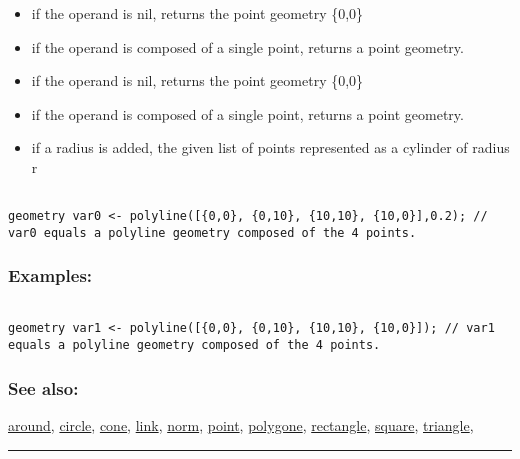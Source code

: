 \documentclass[]{book}
\providecommand{\tightlist}{%
  \setlength{\itemsep}{0pt}\setlength{\parskip}{0pt}}
\theoremstyle{definition}
\theoremstyle{definition}
\theoremstyle{definition}
\theoremstyle{remark}
\begin{document}
\begin{itemize}
\tightlist
\item
  if the operand is nil, returns the point geometry \{0,0\}\\
\item
  if the operand is composed of a single point, returns a point
  geometry.\\
\item
  if the operand is nil, returns the point geometry \{0,0\}\\
\item
  if the operand is composed of a single point, returns a point
  geometry.\\
\item
  if a radius is added, the given list of points represented as a
  cylinder of radius r
\end{itemize}

\begin{verbatim}
 
geometry var0 <- polyline([{0,0}, {0,10}, {10,10}, {10,0}],0.2); // var0 equals a polyline geometry composed of the 4 points.
\end{verbatim}

\subsubsection{Examples:}\label{examples-223}

\begin{verbatim}
 
geometry var1 <- polyline([{0,0}, {0,10}, {10,10}, {10,0}]); // var1 equals a polyline geometry composed of the 4 points.
\end{verbatim}

\subsubsection{See also:}\label{see-also-125}

\href{OperatorsAA\#around}{around}, \href{OperatorsBC\#circle}{circle},
\href{OperatorsBC\#cone}{cone}, \href{OperatorsIM\#link}{link},
\href{OperatorsNR\#norm}{norm}, \href{OperatorsNR\#point}{point},
\href{OperatorsSZ\#polygone}{polygone},
\href{OperatorsNR\#rectangle}{rectangle},
\href{OperatorsSZ\#square}{square},
\href{OperatorsSZ\#triangle}{triangle},

\begin{center}\rule{0.5\linewidth}{\linethickness}\end{center}
\end{document}
